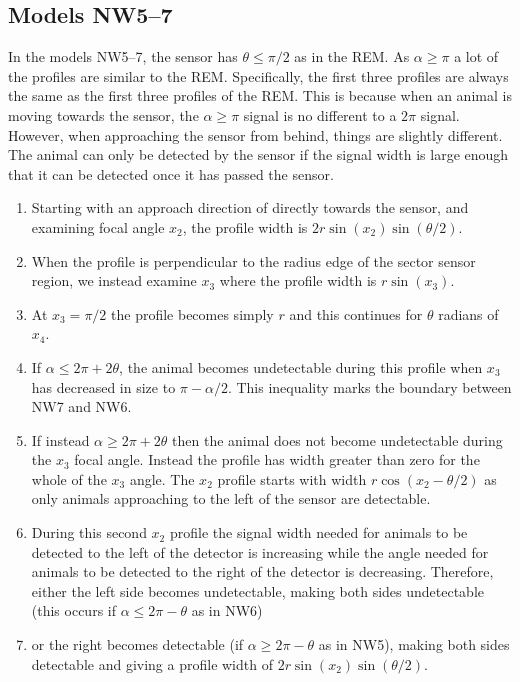 

\subsection{Models NW5--7} \label{NW57}

In the models NW5--7, the sensor has $\theta \le \pi/2$ as in the REM.
As $\alpha \ge \pi$ a lot of the profiles are similar to the REM.
Specifically, the first three profiles are always the same as the first three profiles of the REM.
This is because when an animal is moving towards the sensor, the $\alpha \ge \pi$ signal is no different to a $2\pi$ signal.
However, when approaching the sensor from behind, things are slightly different.
The animal can only be detected by the sensor if the signal width is large enough that it can be detected once it has passed the sensor.
                    
\begin{enumerate}
\item Starting with an approach direction of directly towards the sensor, and examining focal angle $x_2$, the profile width is $2r\sin(x_2)\sin(\theta/2)$.
\item When the profile is perpendicular to the radius edge of the sector sensor region, we instead examine $x_3$ where the profile width is $r\sin(x_3)$.
\item At $x_3=\pi/2$ the profile becomes simply $r$ and this continues for $\theta $ radians of $x_4$.
\item If $\alpha \le 2\pi + 2\theta$, the animal becomes undetectable during this profile when  $x_3$ has decreased in size to $\pi - \alpha/2$.
This inequality marks the boundary between NW7 and NW6.
\item If instead $\alpha \ge 2\pi + 2\theta$ then the animal does not become undetectable during the $x_3$ focal angle.
Instead the profile has width greater than zero for the whole of the $x_3$ angle.
The $x_2$ profile starts with width $r\cos(x_2 - \theta/2)$ as only animals approaching to the left of the sensor are detectable.
\item During this second $x_2$ profile the signal width needed for animals to be detected to the left of the detector is increasing while the angle needed for animals to be detected to the right of the detector is decreasing.
Therefore, either the left side becomes undetectable, making both sides undetectable (this occurs if $\alpha \le 2\pi - \theta$ as in NW6) \item or the right becomes detectable (if $\alpha \ge 2\pi - \theta$ as in NW5), making both sides detectable and giving a profile width of $2r\sin(x_2)\sin(\theta/2)$.
\end{enumerate}


